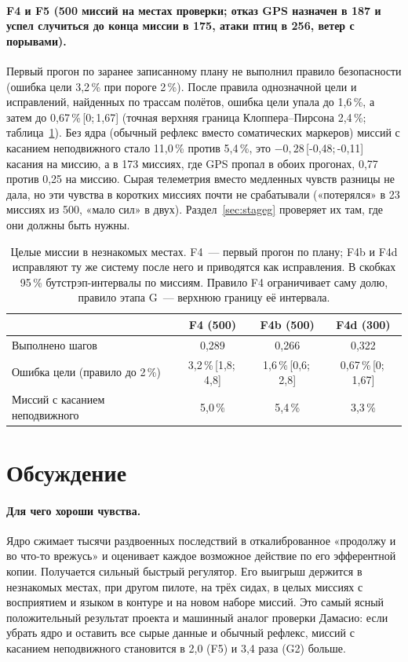 \documentclass[10pt]{article}
\newcommand{\ci}[2]{\,[#1;\,#2]}
\begin{document}
\paragraph{F4 и F5 (500 миссий на местах проверки; отказ GPS назначен в 187 и успел случиться до конца миссии в 175, атаки птиц в 256, ветер с порывами).} Первый прогон по
заранее записанному плану не выполнил правило безопасности (ошибка цели 3,2\,\% при пороге 2\,\%). После правила однозначной цели
и исправлений, найденных по трассам полётов, ошибка цели упала до 1,6\,\%, а затем до 0,67\,\%\ci{0}{1{,}67}
(точная верхняя граница Клоппера--Пирсона 2,4\,\%; таблица~\ref{tab:f4}). Без ядра (обычный рефлекс вместо соматических маркеров) миссий с касанием неподвижного стало 11,0\,\% против
5,4\,\%, это $-0{,}28$\ci{-0{,}48}{-0{,}11} касания на миссию, а в 173 миссиях, где GPS пропал в обоих прогонах, 0,77 против 0,25 на миссию. Сырая телеметрия вместо
медленных чувств разницы не дала, но эти чувства в коротких миссиях почти не срабатывали («потерялся» в 23 миссиях из 500, «мало
сил» в двух). Раздел~\ref{sec:stageg} проверяет их там, где они должны быть нужны.

\begin{table}[t]
\centering\small
\caption{Целые миссии в незнакомых местах. F4~--- первый прогон по плану; F4b и F4d исправляют ту же систему после него и
приводятся как исправления. В скобках 95\,\% бутстрэп-интервалы по миссиям. Правило F4 ограничивает саму долю, правило
этапа G~--- верхнюю границу её интервала.}
\label{tab:f4}
\begin{tabular}{@{}lccc@{}}
\toprule
 & F4 (500) & F4b (500) & F4d (300) \\
\midrule
Выполнено шагов & 0,289 & 0,266 & 0,322 \\
Ошибка цели (правило до 2\,\%) & 3,2\,\%\ci{1{,}8}{4{,}8} & 1,6\,\%\ci{0{,}6}{2{,}8} & 0,67\,\%\ci{0}{1{,}67} \\
Миссий с касанием неподвижного & 5,0\,\% & 5,4\,\% & 3,3\,\% \\
\bottomrule
\end{tabular}
\end{table}



\section{Обсуждение}
\paragraph{Для чего хороши чувства.} Ядро сжимает тысячи раздвоенных последствий в откалиброванное «продолжу и во что-то врежусь»
и оценивает каждое возможное действие по его эфферентной копии. Получается сильный быстрый регулятор. Его выигрыш держится в
незнакомых местах, при другом пилоте, на трёх сидах, в целых миссиях с восприятием и языком в контуре и на новом наборе миссий.
Это самый ясный положительный результат проекта и машинный аналог проверки Дамасио: если убрать ядро и оставить все сырые данные
и обычный рефлекс, миссий с касанием неподвижного становится в 2,0 (F5) и 3,4 раза (G2) больше.
\end{document}
